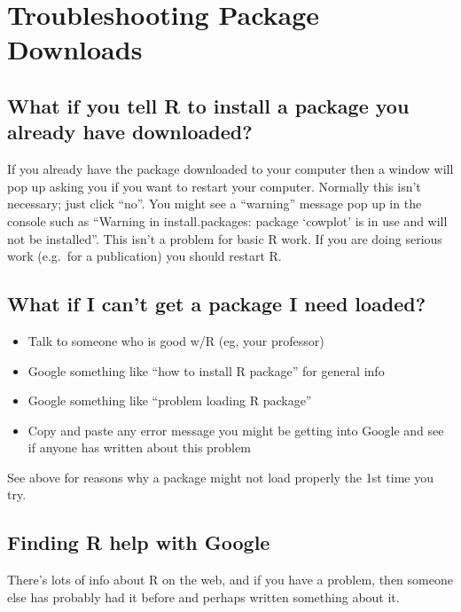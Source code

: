 \documentclass[]{book}
\providecommand{\tightlist}{%
  \setlength{\itemsep}{0pt}\setlength{\parskip}{0pt}}
\theoremstyle{definition}
\theoremstyle{definition}
\theoremstyle{definition}
\theoremstyle{remark}
\begin{document}
\section{Troubleshooting Package
Downloads}\label{troubleshooting-package-downloads}

\subsection{What if you tell R to install a package you already have
downloaded?}\label{what-if-you-tell-r-to-install-a-package-you-already-have-downloaded}

If you already have the package downloaded to your computer then a
window will pop up asking you if you want to restart your computer.
Normally this isn't necessary; just click ``no''. You might see a
``warning'' message pop up in the console such as ``Warning in
install.packages: package `cowplot' is in use and will not be
installed''. This isn't a problem for basic R work. If you are doing
serious work (e.g.~for a publication) you should restart R.

\subsection{What if I can't get a package I need
loaded?}\label{what-if-i-cant-get-a-package-i-need-loaded}

\begin{itemize}
\tightlist
\item
  Talk to someone who is good w/R (eg, your professor)
\item
  Google something like ``how to install R package'' for general info
\item
  Google something like ``problem loading R package''
\item
  Copy and paste any error message you might be getting into Google and
  see if anyone has written about this problem
\end{itemize}

See above for reasons why a package might not load properly the 1st time
you try.

\subsection{Finding R help with
Google}\label{finding-r-help-with-google}

There's lots of info about R on the web, and if you have a problem, then
someone else has probably had it before and perhaps written something
about it.
\end{document}
